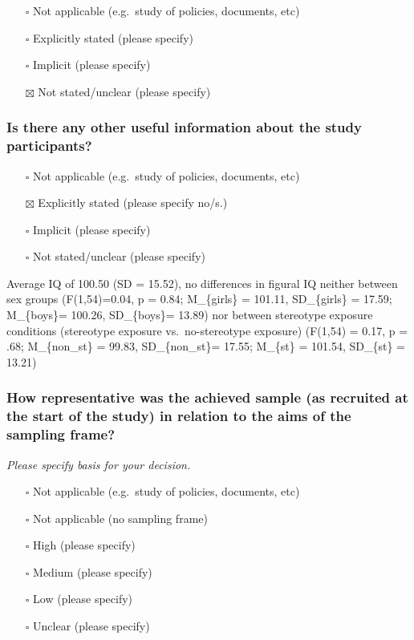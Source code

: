 \documentclass[
  doc, a4paper]{apa7}
\providecommand{\tightlist}{%
  \setlength{\itemsep}{0pt}\setlength{\parskip}{0pt}}
\begin{document}
\begin{itemize}
\tightlist
\item[$\square$]
  Not applicable (e.g.~study of policies, documents, etc)
\item[$\square$]
  Explicitly stated (please specify)
\item[$\square$]
  Implicit (please specify)
\item[$\boxtimes$]
  Not stated/unclear (please specify)
\end{itemize}

\subsubsection{Is there any other useful information about the study participants?}\label{is-there-any-other-useful-information-about-the-study-participants}

\begin{itemize}
\tightlist
\item[$\square$]
  Not applicable (e.g.~study of policies, documents, etc)
\item[$\boxtimes$]
  Explicitly stated (please specify no/s.)
\item[$\square$]
  Implicit (please specify)
\item[$\square$]
  Not stated/unclear (please specify)
\end{itemize}

Average IQ of 100.50 (SD = 15.52), no differences in figural IQ neither between sex groups (F(1,54)=0.04, p = 0.84; M\_\{girls\} = 101.11, SD\_\{girls\} = 17.59; M\_\{boys\}= 100.26, SD\_\{boys\}= 13.89) nor between stereotype exposure conditions (stereotype exposure vs.~no-stereotype exposure) (F(1,54) = 0.17, p = .68; M\_\{non\_st\} = 99.83, SD\_\{non\_st\}= 17.55; M\_\{st\} = 101.54, SD\_\{st\} = 13.21)

\subsubsection{How representative was the achieved sample (as recruited at the start of the study) in relation to the aims of the sampling frame?}\label{how-representative-was-the-achieved-sample-as-recruited-at-the-start-of-the-study-in-relation-to-the-aims-of-the-sampling-frame}

\emph{Please specify basis for your decision.}

\begin{itemize}
\tightlist
\item[$\square$]
  Not applicable (e.g.~study of policies, documents, etc)
\item[$\square$]
  Not applicable (no sampling frame)
\item[$\square$]
  High (please specify)
\item[$\square$]
  Medium (please specify)
\item[$\square$]
  Low (please specify)
\item[$\square$]
  Unclear (please specify)
\end{itemize}
\end{document}
